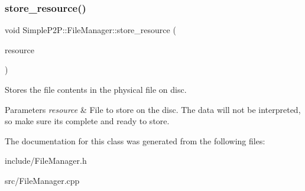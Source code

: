 \subsubsection{\texorpdfstring{store\+\_\+resource()}{store\_resource()}}
{\footnotesize\ttfamily void Simple\+P2\+P\+::\+File\+Manager\+::store\+\_\+resource (\begin{DoxyParamCaption}\item[{Complete\+Resource \&}]{resource }\end{DoxyParamCaption})}



Stores the file contents in the physical file on disc. 


\begin{DoxyParams}{Parameters}
{\em resource} & File to store on the disc. The data will not be interpreted, so make sure it\textquotesingle{}s complete and ready to store. \\
\hline
\end{DoxyParams}


The documentation for this class was generated from the following files\+:\begin{DoxyCompactItemize}
\item 
include/File\+Manager.\+h\item 
src/File\+Manager.\+cpp\end{DoxyCompactItemize}
